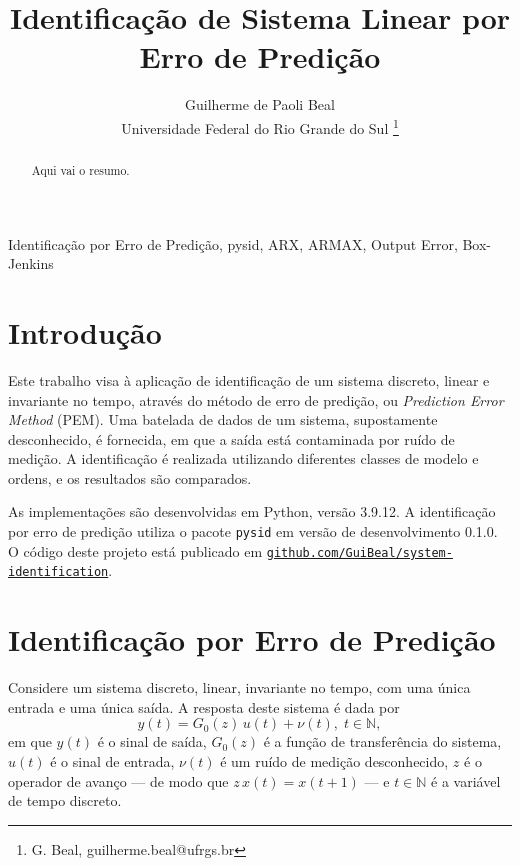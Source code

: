\documentclass{ppgeesa}
\newcommand{\Prod}{\,}
\begin{document}

\title{Identificação de Sistema Linear por Erro de Predição}
\author{Guilherme de Paoli Beal
  \\
  {\small Universidade Federal do Rio Grande do Sul}
  \thanks{G. Beal, guilherme.beal@ufrgs.br}
}
\maketitle
\thispagestyle{empty}\pagestyle{empty}

\begin{abstract}
  Aqui vai o resumo. %
\end{abstract}

\begin{IEEEkeywords}
  Identificação por Erro de Predição, pysid, ARX, ARMAX, Output Error, Box-Jenkins
\end{IEEEkeywords}

\section{Introdução}

Este trabalho visa à aplicação de identificação de um sistema discreto, linear e invariante no tempo, através do método de erro de predição, ou \emph{Prediction Error Method} (PEM).
Uma batelada de dados de um sistema, supostamente desconhecido, é fornecida, em que a saída está contaminada por ruído de medição.
A identificação é realizada utilizando diferentes classes de modelo e ordens, e os resultados são comparados.

As implementações são desenvolvidas em Python, versão 3.9.12.
A identificação por erro de predição utiliza o pacote \texttt{pysid} em versão de desenvolvimento 0.1.0.
O código deste projeto está publicado em \href{https://github.com/GuiBeal/system-identification}{\texttt{github.com/GuiBeal/system-identification}}.

\section{Identificação por Erro de Predição}

Considere um sistema discreto, linear, invariante no tempo, com uma única entrada e uma única saída.
A resposta deste sistema é dada por
\begin{equation}\label{eq:system}
  y(t) = G_0(z) \Prod u(t) + \nu(t)
  ,\; t \in \mathbb{N}
  ,
\end{equation}
em que
$y(t)$ é o sinal de saída,
$G_0(z)$ é a função de transferência do sistema,
$u(t)$ é o sinal de entrada,
$\nu(t)$ é um ruído de medição desconhecido, %
$z$ é o operador de avanço --- de modo que $z \Prod x(t) = x(t+1)$ --- e
$t \in \mathbb{N}$ é a variável de tempo discreto.
\end{document}
